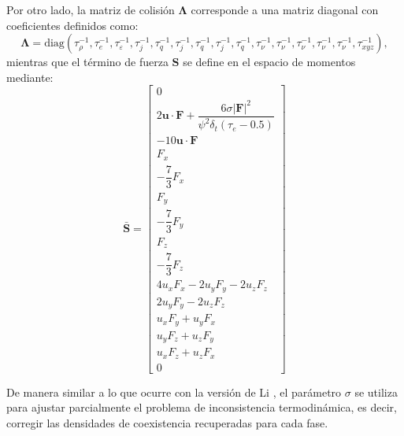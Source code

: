 Por otro lado, la matriz de colisi\'on $\bm{\Lambda}$ corresponde a una matriz diagonal con coeficientes definidos como:
\begin{equation}
	\bm{\Lambda} = \mbox{diag}(\tau_{\rho}^{-1}, \tau_{e}^{-1}, \tau_{\varepsilon}^{-1}, \tau_{j}^{-1}, \tau_{q}^{-1}, \tau_{j}^{-1}, \tau_{q}^{-1}, \tau_{j}^{-1}, \tau_{q}^{-1}, \tau_{\nu}^{-1}, \tau_{\nu}^{-1}, \tau_{\nu}^{-1}, \tau_{\nu}^{-1}, \tau_{\nu}^{-1}, \tau_{xyz}^{-1}),
\end{equation}
mientras que el t\'ermino de fuerza $\bm{S}$ se define en el espacio de momentos mediante:
\begin{equation}
 \bar{\bm{S}} = 
 \left[ 
 	\begin{array}{c} 
 		0	\\
 		2 \bm{u} \cdot \bm{F} + \dfrac{6\sigma |\bm{F}|^2}{\psi^2 \delta_t (\tau_e-0.5)} \\
 		-10 \bm{u} \cdot \bm{F} \\
 		F_x \\
 		-\dfrac{7}{3}F_x \\
 		F_y \\
 		-\dfrac{7}{3}F_y \\
 		F_z \\
 		-\dfrac{7}{3}F_z \\ 		
		4u_xF_x - 2u_yF_y - 2u_zF_z \\
		2u_yF_y - 2u_zF_z \\
		u_xF_y + u_yF_x \\
		u_yF_z + u_zF_y \\
		u_xF_z + u_zF_x \\
		0
 	\end{array} 
 \right]
 \label{eq:s_xu}
\end{equation}

De manera similar a lo que ocurre con la versi\'on de Li \cite{li_lattice_2013}, el par\'ametro $\sigma$ se utiliza para ajustar parcialmente el problema de inconsistencia termodin\'amica, es decir, corregir las densidades de coexistencia recuperadas para cada fase. 

